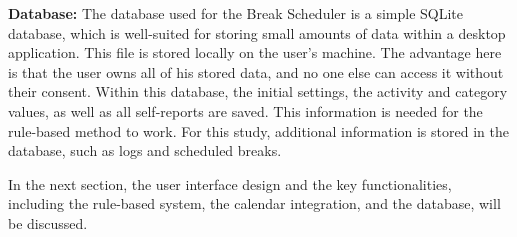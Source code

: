 \documentclass{hasel_thesis}
\begin{document}
\textbf{Database:} The database used for the Break Scheduler is a simple SQLite database, which is well-suited for storing small amounts of data within a desktop application. This file is stored locally on the user's machine. The advantage here is that the user owns all of his stored data, and no one else can access it without their consent. Within this database, the initial settings, the activity and category values, as well as all self-reports are saved. This information is needed for the rule-based method to work. For this study, additional information is stored in the database, such as logs and scheduled breaks.

In the next section, the user interface design and the key functionalities, including the rule-based system, the calendar integration, and the database, will be discussed.
\end{document}
